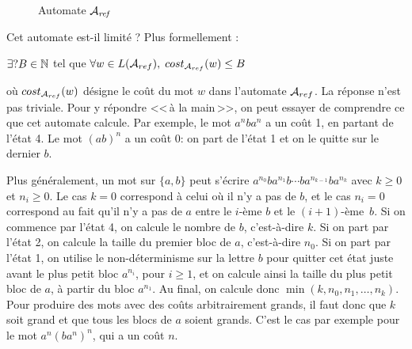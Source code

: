 \documentclass[12pt]{memoir}
\begin{document}
\begin{figure}[h]
  \centering
  \caption{Automate $\mathcal{A}_\mathit{ref}$}
\label{fig:2}
\end{figure}

Cet automate est-il limité ? Plus formellement : 
\begin{center}
$\exists ?B \in \mathbb{N}$ tel que $\forall w \in L(\mathcal{A}_{ref}), \; cost_{\mathcal{A}_{ref}}(w)\le B$\\
\end{center}
où $ cost_{\mathcal{A}_{ref}}(w)$ désigne le coût du mot $w$ dans l'automate $\mathcal{A}_{ref}$.
La réponse n'est pas triviale. Pour y répondre <<\,à la main\,>>, on peut
essayer de comprendre ce que cet automate calcule. Par exemple, le mot $a^nba^n$
a un coût 1, en partant de l'état 4. Le mot $(ab)^n$ a un coût 0: on part de
l'état 1 et on le quitte sur le dernier $b$. 


Plus généralement, un mot sur $\{a,b\}$ peut s'écrire $a^{n_0}ba^{n_1}b\cdots
ba^{n_{k-1}}ba^{n_k}$ avec $k\geqslant 0$ et $n_i\geqslant0$. Le cas $k=0$
correspond à celui où il n'y a pas de $b$, et le cas $n_i=0$ correspond au
fait qu'il n'y a pas de $a$ entre le $i$-ème $b$ et le $(i+1)$-ème~$b$.  Si on
commence par l'état 4, on calcule le nombre de $b$, c'est-à-dire $k$. Si on
part par l'état 2, on calcule la taille du premier bloc de $a$, c'est-à-dire
$n_0$. Si on part par l'état 1, on utilise le non-déterminisme sur la lettre
$b$ pour quitter cet état juste avant le plus petit bloc $a^{n_i}$, pour
$i\geqslant1$, et on calcule ainsi la taille du plus petit bloc de $a$, à
partir du bloc $a^{n_1}$. Au final, on calcule donc
$\min(k,n_0,n_1,\ldots,n_k)$. Pour produire des mots avec des coûts
arbitrairement grands, il faut donc que $k$ soit grand et que tous les blocs
de $a$ soient grands. C'est le cas par exemple pour le mot $a^n(ba^n)^n$, qui
a un coût $n$.
\end{document}

